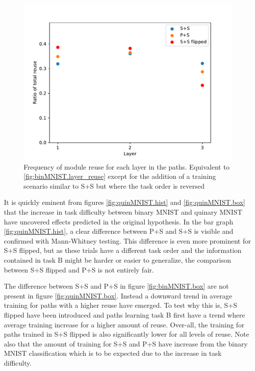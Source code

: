 \begin{figure}[t]
    \includegraphics[width=\textwidth]{Chapters/4.Experiments/exp1/figures/QUIN_reuse_by_layer.pdf}
    \caption[Reuse by layer for quinary MNIST classification]{Frequency of module reuse for each layer in the paths. Equivalent to \ref{fig:binMNIST.layer_reuse} except for the addition of a training scenario similar to S+S but where the task order is reversed}
    \label{fig:quinMNIST.layer_reuse}
\end{figure}

It is quickly eminent from figures \ref{fig:quinMNIST.hist} and \ref{fig:quinMNIST.box} that the increase in task difficulty between binary MNIST and quinary MNIST have uncovered effects predicted in the original hypothesis. In the bar graph \ref{fig:quinMNIST.hist}, a clear difference between P+S and S+S is visible and confirmed with Mann-Whitney testing. This difference is even more prominent for S+S flipped, but as these trials have a different task order and the information contained in task B might be harder or easier to generalize, the comparison between S+S flipped and P+S is not entirely fair. 

The difference between S+S and P+S in figure \ref{fig:binMNIST.box} are not present in figure \ref{fig:quinMNIST.box}. Instead a downward trend in average training for paths with a higher reuse have emerged. To test why this is, S+S flipped have been introduced and paths learning task B first have a trend where average training increase for a higher amount of reuse. Over-all, the training for paths trained in S+S flipped is also significantly lower for all levels of reuse. Note also that the amount of training for S+S and P+S have increase from the binary MNIST classification which is to be expected due to the increase in task difficulty. 

